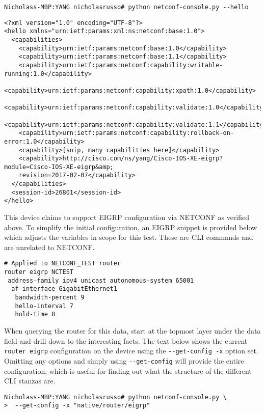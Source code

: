 \begin{verbatim}
Nicholass-MBP:YANG nicholasrusso# python netconf-console.py --hello
\end{verbatim}

\begin{verbatim}
<?xml version="1.0" encoding="UTF-8"?>
<hello xmlns="urn:ietf:params:xml:ns:netconf:base:1.0">
  <capabilities>
    <capability>urn:ietf:params:netconf:base:1.0</capability>
    <capability>urn:ietf:params:netconf:base:1.1</capability>
    <capability>urn:ietf:params:netconf:capability:writable-running:1.0</capability>
    <capability>urn:ietf:params:netconf:capability:xpath:1.0</capability>
    <capability>urn:ietf:params:netconf:capability:validate:1.0</capability>
    <capability>urn:ietf:params:netconf:capability:validate:1.1</capability>
    <capability>urn:ietf:params:netconf:capability:rollback-on-error:1.0</capability>
    <capability>[snip, many capabilities here]</capability>
    <capability>http://cisco.com/ns/yang/Cisco-IOS-XE-eigrp?module=Cisco-IOS-XE-eigrp&amp;
	revision=2017-02-07</capability>
  </capabilities>
  <session-id>26801</session-id>
</hello>
\end{verbatim}

This device claims to support EIGRP configuration via NETCONF as verified
above. To simplify the initial configuration, an EIGRP snippet is provided
below which adjusts the variables in scope for this test. These are CLI
commands and are unrelated to NETCONF\@.

\begin{verbatim}
# Applied to NETCONF_TEST router
router eigrp NCTEST
 address-family ipv4 unicast autonomous-system 65001
  af-interface GigabitEthernet1
   bandwidth-percent 9
   hello-interval 7
   hold-time 8
\end{verbatim}

When querying the router for this data, start at the topmost layer under the
data field and drill down to the interesting facts. The text below shows the
current \verb|router eigrp| configuration on the device using the
\verb|--get-config -x| option set. Omitting any options and simply using
\verb|--get-config| will provide the entire configuration, which is useful for
finding out what the structure of the different CLI stanzas are.

\begin{verbatim}
Nicholass-MBP:YANG nicholasrusso# python netconf-console.py \
>  --get-config -x "native/router/eigrp"
\end{verbatim}

